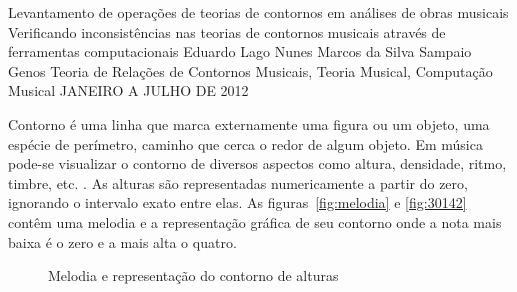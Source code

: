 \documentclass[11pt]{article}
\begin{document}
\graphicspath{{figs/}}


\dadosRelatorioFinal
{Levantamento de operações de teorias de contornos em análises de
  obras musicais}
{Verificando inconsistências nas teorias de contornos musicais através
  de ferramentas computacionais }
{Eduardo Lago Nunes}
{Marcos da Silva Sampaio}
{Genos}
{Teoria de Relações de Contornos Musicais, Teoria Musical, Computação Musical}
{JANEIRO A JULHO DE 2012}


\newpage

\setcounter{page}{1}
\onehalfspace

\label{sec:introducao}

Contorno é uma linha que marca externamente uma figura ou um objeto,
uma espécie de perímetro, caminho que cerca o redor de
algum objeto. Em música pode-se visualizar o contorno de
diversos aspectos como altura, densidade, ritmo, timbre, etc.
\cite[p. 01]{Sampaio2008}. As alturas são representadas numericamente
a partir do zero, ignorando o intervalo exato entre elas. As
figuras~\ref{fig:melodia} e \ref{fig:30142} contêm uma melodia e a
representação gráfica de seu contorno onde a nota mais baixa é o zero
e a mais alta o quatro.

\begin{figure}[h]
  \centering
  \caption{Melodia e representação do contorno de alturas}
  \label{fig:melodia-representacao}
\end{figure}
\end{document}
